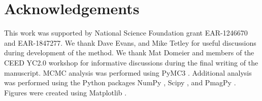 \documentclass[11pt,letterpaper]{article}
\begin{document}



\section*{Acknowledgements}
\label{sec:acknowledgements}
This work was supported by National Science Foundation grant EAR-1246670 and EAR-1847277. We thank Dave Evans, and Mike Tetley for useful discussions during development of the method. We thank Mat Domeier and members of the CEED YC2.0 workshop for informative discussions during the final writing of the manuscript. MCMC analysis was performed using PyMC3 \citep{Salvatier2016a}. Additional analysis was performed using the Python packages NumPy \citep{Harris2020a}, Scipy \citep{Virtanen2020a}, and PmagPy \citep{Tauxe2016a}. Figures were created using Matplotlib \citep{Hunter2007a}.

\clearpage
\newpage
\footnotesize

\singlespacing



\end{document}
